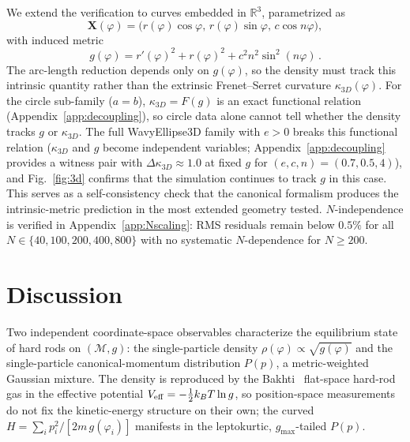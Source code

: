 \documentclass[aps,pre,twocolumn,superscriptaddress,longbibliography,floatfix]{revtex4-2}
\begin{document}
We extend the verification to curves embedded in $\mathbb{R}^3$, parametrized as
\begin{equation}
  \bm{X}(\varphi) = \bigl(r(\varphi)\cos\varphi,\,r(\varphi)\sin\varphi,\,c\cos n\varphi\bigr),
  \label{eq:wavy3d}
\end{equation}
with induced metric
\begin{equation}
  g(\varphi) = r'(\varphi)^2 + r(\varphi)^2 + c^2n^2\sin^2\!(n\varphi)\,.
  \label{eq:g3d}
\end{equation}
The arc-length reduction depends only on $g(\varphi)$, so the density must track this
intrinsic quantity rather than the extrinsic Frenet--Serret curvature
$\kappa_{3D}(\varphi)$.
For the circle sub-family ($a=b$), $\kappa_{3D}=F(g)$ is an exact functional relation
(Appendix~\ref{app:decoupling}), so circle data alone cannot tell whether the density tracks
$g$ or $\kappa_{3D}$.
The full WavyEllipse3D family with $e>0$ breaks this functional relation
($\kappa_{3D}$ and $g$ become independent variables; Appendix~\ref{app:decoupling}
provides a witness pair with $\Delta\kappa_{3D}\approx 1.0$ at fixed $g$ for
$(e,c,n)=(0.7,0.5,4)$), and Fig.~\ref{fig:3d} confirms that the simulation continues to
track $g$ in this case.
This serves as a self-consistency check that the canonical formalism produces the
intrinsic-metric prediction in the most extended geometry tested.
$N$-independence is verified in Appendix~\ref{app:Nscaling}: RMS residuals remain below
$0.5\%$ for all $N\in\{40,100,200,400,800\}$ with no systematic $N$-dependence for
$N\geq 200$.

\clearpage
\section{Discussion}
\label{sec:discussion}

Two independent coordinate-space observables characterize the equilibrium state of hard
rods on $(\mathcal{M},g)$: the single-particle density $\rho(\varphi)\propto\sqrt{g(\varphi)}$
and the single-particle canonical-momentum distribution $P(p)$, a metric-weighted Gaussian
mixture.
The density is reproduced by the Bakhti~\cite{Bakhti2015} flat-space hard-rod gas in the
effective potential $V_{\rm eff}=-\tfrac{1}{2}k_BT\ln g$, so position-space measurements
do not fix the kinetic-energy structure on their own; the curved $H=\sum_i p_i^2/[2m\,g(\varphi_i)]$
manifests in the leptokurtic, $g_{\max}$-tailed $P(p)$.
\end{document}
